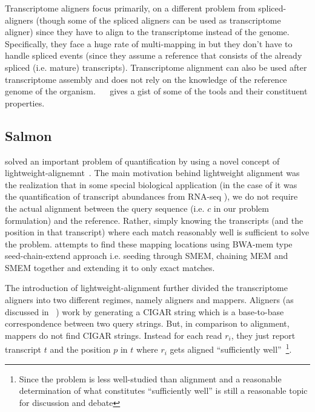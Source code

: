 Transcriptome aligners focus primarily, on a different problem from spliced-aligners (though some of the spliced aligners can be used as transcriptome aligner) since they have to align \reads to the transcriptome instead of the genome. Specifically, they face a huge rate of multi-mapping in \reads but they don't have to handle spliced events (since they assume a reference that consists of the already spliced (i.e. mature) transcripts). Transcriptome alignment can also be used after \denovo transcriptome assembly and does not rely on the knowledge of the reference genome of the organism. ~~\citep{li2010survey} gives a gist of some of the tools and their constituent properties.

\subsection{Salmon~\citep{salmon}} \label{salmon}

\salmon solved an important problem of quantification by using a novel concept of lightweight-alignemnt~\citep{salmon}. The main motivation behind lightweight alignment was the realization that in some special biological application (in the case of \salmon it was the quantification of transcript abundances from RNA-seq \reads), we do not require the actual alignment between the query sequence (i.e. $c$ in our problem formulation) and the reference. Rather, simply knowing the transcripts (and the position in that transcript) where each match reasonably well is sufficient to solve the problem. \salmon attempts to find these mapping locations using BWA-mem type seed-chain-extend approach i.e. seeding through SMEM, chaining MEM and SMEM together and extending it to only exact matches.

The introduction of lightweight-alignment further divided the transcriptome aligners into two different regimes, namely aligners and mappers. Aligners (as discussed in ~) work by generating a CIGAR string which is a base-to-base correspondence between two query strings. But, in comparison to alignment, mappers do not find CIGAR strings. Instead for each read $r_i$, they just report transcript $t$ and the position $p$ in $t$ where $r_i$ gets aligned “sufficiently well”~\citep{blog}\footnote{Since the problem is less well-studied than alignment and a reasonable determination of what constitutes “sufficiently well” is still a reasonable topic for discussion and debate}.

